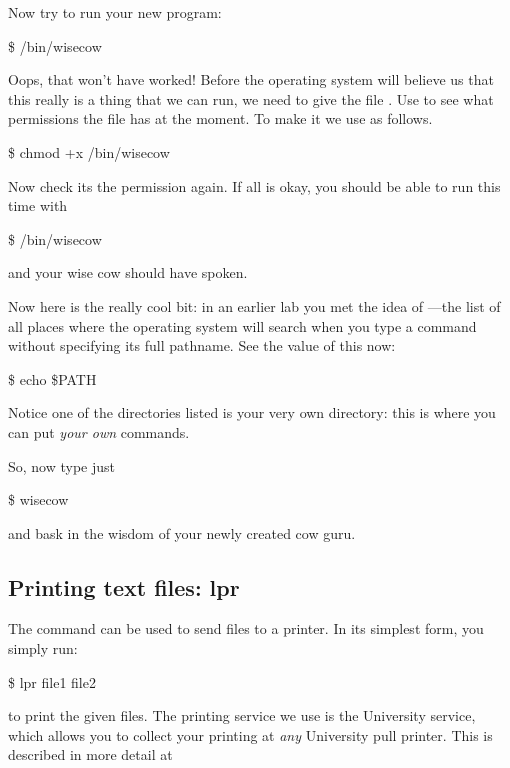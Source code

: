 Now try to run your new program:

\begin{ttoutenv}
\$  \tilde/bin/wisecow
\end{ttoutenv}

Oops, that won't have worked! Before the operating system will believe us
that this really is a thing that we can run, we need to give the file . Use  to see what permissions the file has at the
moment. To make it  we use  as follows.

\begin{ttoutenv}
\$  chmod +x \tilde/bin/wisecow
\end{ttoutenv}

Now check its the permission again. If all is okay, you should be able to run
this time with

\begin{ttoutenv}
\$  \tilde/bin/wisecow
\end{ttoutenv}

and your wise cow should have spoken.

Now here is the really cool bit: in an earlier lab you met the idea of
---the list of all places where the operating system will
search when you type a command without specifying its full pathname. See the
value of this now:

\begin{ttoutenv}
\$  echo \$PATH
\end{ttoutenv}

Notice one of the directories listed is your very own  directory: this
is where you can put \emph{your own} commands.

So, now type just

\begin{ttoutenv}
\$ wisecow
\end{ttoutenv}

and bask in the wisdom of your newly created cow guru. 

\subsection{Printing text files: lpr}

The command  can be used to send files to a printer. In its
simplest form, you simply run:
%
\begin{ttoutenv}
\$  lpr file1 file2
\end{ttoutenv}
%
to print the given files. The printing service we use is the University  service, which allows you to collect your printing at \emph{any} University pull printer. This is described in more detail at 

